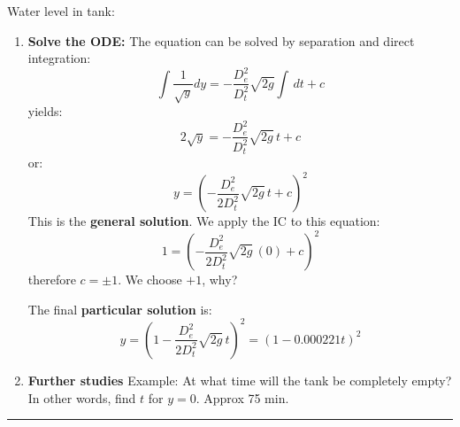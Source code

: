\begin{exmp}{Water level in tank:}
\begin{enumerate}
\begin{itemize}
\begin{itemize}
\begin{equation*}
\end{equation*}
or $U_B=\sqrt{2gy}$
\end{itemize}
Therefore, our volumetric flow rate leaving the tank is: $\dot{V}_{out}=A_e\sqrt{2gy}$ or $\dot{V}_{out}=\frac{\pi}{4}D^2_e\sqrt{2gy}$
\item Our ODE becomes:
\begin{equation*}
\frac{\pi}{4}D^2_t \frac{d y(t)}{dt} =-\frac{\pi}{4}D^2_e\sqrt{2gy}
\end{equation*}
\item Standard form:
\begin{equation*}
 \frac{d y(t)}{dt} =-\frac{D^2_e}{D^2_t}\sqrt{2gy}
\end{equation*}
\item Initial conditions: $y(0)=1$
\end{itemize}
\item \textbf{Solve the ODE:} The equation can be solved by separation and direct integration:
\begin{equation*}
\int \frac{1}{\sqrt{y}}dy=-\frac{D^2_e}{D^2_t}\sqrt{2g}\int\, dt +c
\end{equation*}
yields:
\begin{equation*}
2\sqrt{y}=-\frac{D^2_e}{D^2_t}\sqrt{2g} \, t +c
\end{equation*}
or:
\begin{equation*}
y=\left(-\frac{D^2_e}{2D^2_t}\sqrt{2g} \, t +c\right)^2
\end{equation*}
This is the \textbf{general solution}. We apply the IC to this equation:
\begin{equation*}
1=\left(-\frac{D^2_e}{2D^2_t}\sqrt{2g} \, (0) +c\right)^2
\end{equation*}
therefore $c=\pm 1$. We choose $+1$, why? 

The final \textbf{particular solution} is:
\begin{equation*}
\boxed{y=\left(1-\frac{D^2_e}{2D^2_t}\sqrt{2g} \, t \right)^2=\left(1-0.000221t\right)^2}
\end{equation*}
\item \textbf{Further studies}
Example: At what time will the tank be completely empty? In other words, find $t$ for $y=0$. Approx 75 min.

\end{enumerate}
\end{exmp}


\begin{center}
\noindent\rule{4cm}{0.4pt}
\end{center}
\updateinfo[September 25, 2018]
